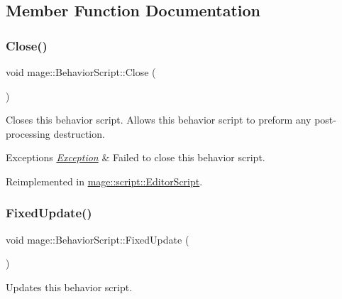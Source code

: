 \subsection{Member Function Documentation}
\hypertarget{classmage_1_1_behavior_script_aaf2b9f6666064f5b6a6e21b7f1623584}{}\label{classmage_1_1_behavior_script_aaf2b9f6666064f5b6a6e21b7f1623584} 
\subsubsection{\texorpdfstring{Close()}{Close()}}
{\footnotesize\ttfamily void mage\+::\+Behavior\+Script\+::\+Close (\begin{DoxyParamCaption}{ }\end{DoxyParamCaption})\hspace{0.3cm}{\ttfamily [virtual]}}

Closes this behavior script. Allows this behavior script to preform any post-\/processing destruction.


\begin{DoxyExceptions}{Exceptions}
{\em \hyperlink{classmage_1_1_exception}{Exception}} & Failed to close this behavior script. \\
\hline
\end{DoxyExceptions}


Reimplemented in \hyperlink{classmage_1_1script_1_1_editor_script_af6093dd776e3822045f452515662463e}{mage\+::script\+::\+Editor\+Script}.

\hypertarget{classmage_1_1_behavior_script_a8318f79ab78798ec37b39bc844f7138c}{}\label{classmage_1_1_behavior_script_a8318f79ab78798ec37b39bc844f7138c} 
\subsubsection{\texorpdfstring{Fixed\+Update()}{FixedUpdate()}}
{\footnotesize\ttfamily void mage\+::\+Behavior\+Script\+::\+Fixed\+Update (\begin{DoxyParamCaption}{ }\end{DoxyParamCaption})\hspace{0.3cm}{\ttfamily [virtual]}}

Updates this behavior script.

